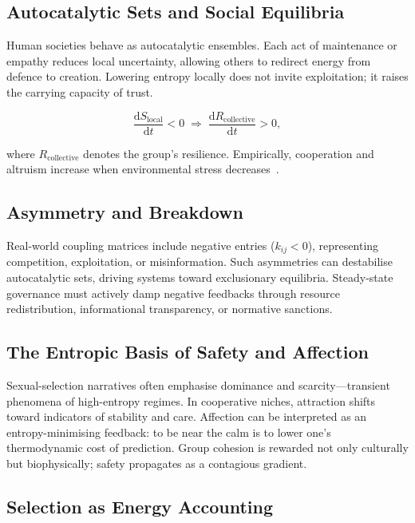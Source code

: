 \documentclass[12pt,a4paper]{article}
\theoremstyle{definition}
\newcommand{\ddt}[1]{\frac{\mathrm{d}#1}{\mathrm{d}t}}
\begin{document}
\subsection{Autocatalytic Sets and Social Equilibria}

Human societies behave as autocatalytic ensembles.  Each act of maintenance
or empathy reduces local uncertainty, allowing others to redirect energy from
defence to creation.  Lowering entropy locally does not invite exploitation;
it raises the carrying capacity of trust.

\begin{equation}
  \ddt{S_{\mathrm{local}}} < 0
  \;\Longrightarrow\;
  \ddt{R_{\mathrm{collective}}} > 0,
\end{equation}

where $R_{\mathrm{collective}}$ denotes the group's resilience.  Empirically,
cooperation and altruism increase when environmental stress
decreases~\citep{bernhard2021}.

\subsection{Asymmetry and Breakdown}

Real-world coupling matrices include negative entries ($k_{ij} < 0$),
representing competition, exploitation, or misinformation.  Such asymmetries
can destabilise autocatalytic sets, driving systems toward exclusionary
equilibria.  Steady-state governance must actively damp negative feedbacks
through resource redistribution, informational transparency, or normative
sanctions.

\subsection{The Entropic Basis of Safety and Affection}

Sexual-selection narratives often emphasise dominance and scarcity---transient
phenomena of high-entropy regimes.  In cooperative niches, attraction shifts
toward indicators of stability and care.  Affection can be interpreted as an
entropy-minimising feedback: to be near the calm is to lower one's
thermodynamic cost of prediction.  Group cohesion is rewarded not only
culturally but biophysically; safety propagates as a contagious gradient.

\subsection{Selection as Energy Accounting}
\end{document}

